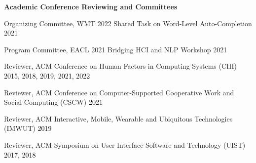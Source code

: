 \documentclass[10pt,A4]{article}
\newcommand{\cvsection}[1]
{
	\begin{center}
		\large\textcolor{sectcol}{\textbf{#1}}
	\end{center}
}
\newcommand{\mystrut}{\rule[-.3\baselineskip]{0pt}{\baselineskip}}
\begin{document}

\vspace{-2mm}



\vspace{-2mm}







\thispagestyle{secondstyle}

\vspace{-2mm}



\vspace{-2mm}






\cvsection{Academic Conference Reviewing and Committees}

Organizing Committee, WMT 2022 Shared Task on Word-Level Auto-Completion \hfill 2021

Program Committee, EACL 2021 Bridging HCI and NLP Workshop \hfill 2021

Reviewer, ACM Conference on Human Factors in Computing Systems (CHI) \hfill \textcolor{black}{2015, 2018, 2019, 2021, 2022}

Reviewer, ACM Conference on Computer-Supported Cooperative Work and Social Computing (CSCW) \hfill \textcolor{black}{2021}

Reviewer, ACM Interactive, Mobile, Wearable and Ubiquitous Technologies (IMWUT) \hfill \textcolor{black}{2019}

Reviewer, ACM Symposium on User Interface Software and Technology (UIST) \hfill \textcolor{black}{2017, 2018}\\















%
%
%
%
%
%
\end{document}
